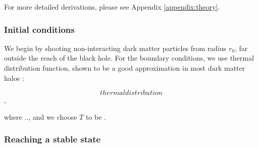 \documentclass[a4paper,10pt]{article}
\begin{document}
% 
% 
% 



% 
% 
% 
% 
% 
% 
% 

For more detailed derivations, please see Appendix \ref{appendix:theory}.

\subsubsection{Initial conditions}

We begin by shooting non-interacting dark matter particles from radius $r_0$, far outside the reach of the black hole. 
For the boundary conditions, we use thermal distribution function, shown to be a good approximation in most 
dark matter halos \citep{dm_halo_maxwellian}:

\begin{equation}
 thermaldistribution
\end{equation},

where .., and we choose $T$ to be \citep{should_be_known}. %

\subsubsection{Reaching a stable state}
\end{document}
